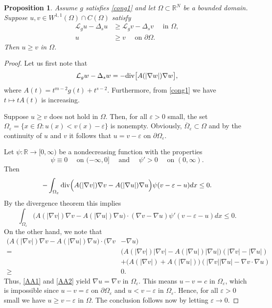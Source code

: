 \documentclass[leqno,12pt]{article}
\numberwithin{equation}{section}
\newcommand{\R}{\mathbb R}
\newcommand{\Lg}{{\mathcal L}_g}
\newtheorem{proposition}[theorem]{Proposition}
\begin{document}
\begin{proposition}\label{cp}
Assume $g$ satisfies \eqref{cong1} and let $\Omega\subset \R^N$ be a bounded domain. Suppose $u,v\in W^{1,1}(\Omega)\cap C(\Omega)$ satisfy 
$$
\begin{aligned}
\Lg u-\Delta_s u &\geq \Lg v -\Delta_s v \quad\mbox{ in } \Omega, \\
u&\geq v \quad\mbox{ on } \partial\Omega.
\end{aligned}
$$ 
Then $u\geq v$ in $\Omega$.
\end{proposition}
\begin{proof} Let us first note that
$$
\Lg w-\Delta_s w=-{\rm div}\big[A(|\nabla w|)\nabla w  \big],
$$
where $A(t)=t^{m-2}g(t)+t^{s-2}$. Furthermore, from \eqref{cong1} we have $t\longmapsto tA(t)$ is increasing.

Suppose $u\geq v$ does not hold in $\Omega$. Then, for all $\varepsilon>0$ small,  the set $\Omega_\varepsilon=\{x\in \Omega:u(x)<v(x)-\varepsilon\}$ is nonempty. Obviously, $\overline \Omega_\varepsilon\subset \Omega$ and by the continuity of $u$ and $v$ it follows that $u=v-\varepsilon$ on $\partial \Omega_\varepsilon$.



Let $\psi:\R\to [0,\infty)$ be a nondecreasing function with the properties 
$$\psi \equiv 0\quad\mbox{ on }(-\infty, 0]\quad\mbox{ and }\quad \psi'>0 \quad\mbox{ on }(0,\infty).
$$ 
Then
$$
-\int_{\Omega_\varepsilon} {\rm div}\Big(A(|\nabla v|)\nabla v -A(|\nabla u|)\nabla u \Big)\psi(v-\varepsilon-u) dx\leq  0.
$$
By the divergence theorem  this implies 
\begin{equation}\label{AA1}
\int_{\Omega_\varepsilon} \Big(A(|\nabla v|)\nabla v -A(|\nabla u|)\nabla u  \Big) \cdot(\nabla v-\nabla u)\psi'(v-\varepsilon-u)dx\leq 0.
\end{equation}
On the other hand, we note that
\begin{equation}\label{AA2}
\begin{aligned}
\Big(A(|\nabla v|)\nabla v -A(|\nabla u|)\nabla u  \Big) \cdot  (\nabla v&-\nabla u)\\
=&
\Big(A(|\nabla v|)|\nabla v| -A(|\nabla u|) |\nabla u|  \Big) (|\nabla v|-|\nabla u|)\\
&+\Big(A(|\nabla v|) +A(|\nabla u|)  \Big) (|\nabla v||\nabla u|-\nabla v\cdot \nabla u)\\
\geq & 0.
\end{aligned}
\end{equation}
Thus, \eqref{AA1} and \eqref{AA2} yield $\nabla u=\nabla v$ in $\Omega_\varepsilon$. This means $u-v=c$ in $\Omega_\varepsilon$, which is impossible since $u-v=\varepsilon$ on $\partial \Omega_\varepsilon$ and $u<v-\varepsilon$ in $\Omega_\varepsilon$.
Hence, for all $\varepsilon>0$ small we have $u\geq v-\varepsilon$ in $\Omega$. The conclusion follows now by letting $\varepsilon\to 0$.
\end{proof}
\end{document}
